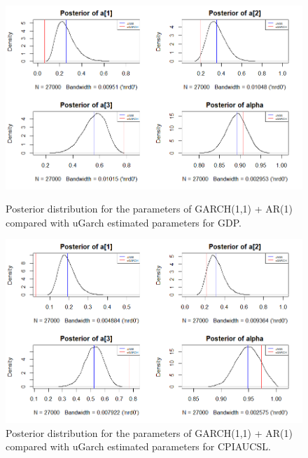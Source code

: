 \begin{figure}[H]
    \centering
    \begin{minipage}{0.49\textwidth}
        \centering
        \includegraphics[width=\textwidth]{images/5-GARCH/GARCH_posterior_distribution_gdp.png}
        \caption{Posterior distribution for the parameters of GARCH(1,1) + AR(1) compared with uGarch estimated parameters for GDP.}
        \label{fig:GARCH_gdp_posteriors}
    \end{minipage}\hfill
    \begin{minipage}{0.49\textwidth}
        \centering
        \includegraphics[width=\textwidth]{images/5-GARCH/GARCH_posterior_distribution_infl.png}
        \caption{Posterior distribution for the parameters of GARCH(1,1) + AR(1) compared with uGarch estimated parameters for CPIAUCSL.}
        \label{fig:GARCH_infl_posteriors}
    \end{minipage}
\end{figure}

